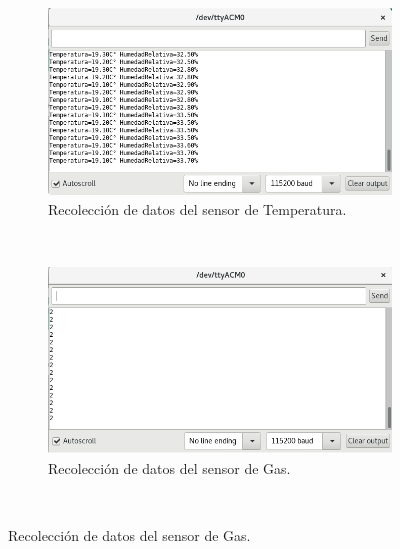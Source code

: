 \documentclass[11pt,letterpaper]{report}
\begin{document}
	\begin{figure}[ht]
    \centering
    \begin{subfigure}[b]{0.44\textwidth}
        \includegraphics[width=\textwidth]{imagenes/datosTemp2.png}
        \caption{Recolección de datos del sensor de Temperatura. }
        \label{fig:temp}
    \end{subfigure}
    ~ %
    \begin{subfigure}[b]{0.44\textwidth}
        \includegraphics[width=\textwidth]{imagenes/datosGas2.png}
        \caption{Recolección de datos del sensor de Gas.}
        \label{fig:gas}
    \end{subfigure}
    ~ %

\end{figure}
\end{document}
